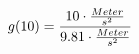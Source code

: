 \documentclass[preview]{standalone}
\begin{document}
\begin{align*}
\special{dvisvgm:raw <g id='unique000'>}g(10) = \frac{10 \cdot \frac{Meter}{s^{2}}}{9.81 \cdot \frac{Meter}{s^{2}}}\special{dvisvgm:raw </g>}
\end{align*}
\end{document}
